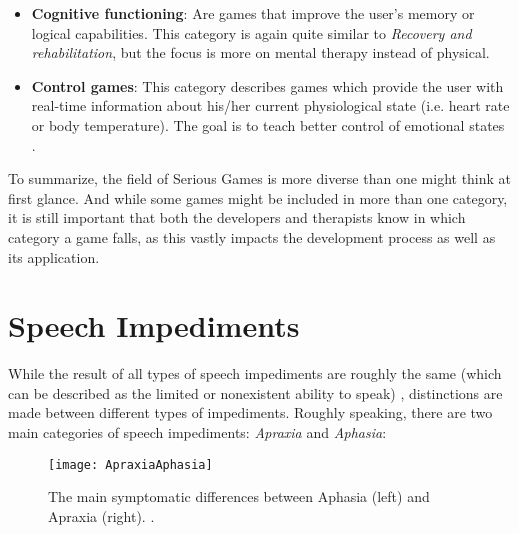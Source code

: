 \documentclass[draft,final]{vutinfth} %
\begin{document}
\begin{itemize}
\item \textbf{Cognitive functioning}: Are games that improve the user's memory or logical capabilities. This category is again quite similar to \emph{Recovery and rehabilitation}, but the focus is more on mental therapy instead of physical.

\item \textbf{Control games}: This category describes games which provide the user with real-time information about his/her current physiological state (i.e. heart rate or body temperature). The goal is to teach better control of emotional states \cite{michael2005serious}.
\end{itemize}
To summarize, the field of Serious Games is more diverse than one might think at first glance. And while some games might be included in more than one category, it is still important that both the developers and therapists know in which category a game falls, as this vastly impacts the development process as well as its application.
\section{Speech Impediments}
While the result of all types of speech impediments are roughly the same (which can be described as the limited or nonexistent ability to speak) \cite{atakpaassessment}, distinctions are made between different types of impediments. Roughly speaking, there are two main categories of speech impediments\cite{proestler2023}: \emph{Apraxia} and \emph{Aphasia}:

\begin{figure}
\begin{center}
\texttt{[image: ApraxiaAphasia]}
\end{center}
\caption{The main symptomatic differences between Aphasia (left) and Apraxia (right).  \cite{ApraxiaAphasia}.}
\end{figure}
\end{document}
